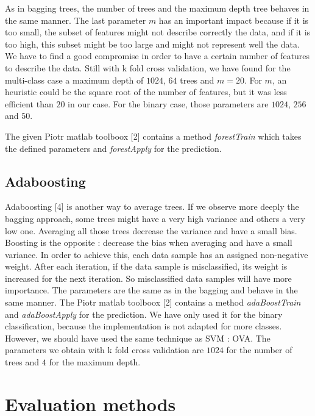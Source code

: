 \documentclass{article} %
\begin{document}
As in bagging trees, the number of trees and the maximum depth tree behaves in the same manner. The last parameter $m$ has an important impact because if it is too small, the subset of features might not describe correctly the data, and if it is too high, this subset might be too large and might not represent well the data. We have to find a good compromise in order to have a certain number of features to describe the data. Still with k fold cross validation, we have found for the multi-class case a maximum depth of $1024$,  $64$ trees and $m = 20$. For $m$, an heuristic could be the square root of the number of features, but it was less efficient than $20$ in our case. For the binary case, those parameters are $1024$, $256$ and $50$.

The given Piotr matlab toolboox [2] contains a method \textit{forestTrain} which takes the defined parameters and \textit{forestApply} for the prediction.

\subsection{Adaboosting}

Adaboosting [4] is another way to average trees. If we observe more deeply the bagging approach, some trees might have a very high variance and others a very low one. Averaging all those trees decrease the variance and have a small bias. Boosting is the opposite : decrease the bias when averaging and have a small variance. In order to achieve this, each data sample has an assigned non-negative weight. After each iteration, if the data sample is misclassified, its weight is increased for the next iteration. So misclassified data samples will have more importance. The parameters are the same as in the bagging and behave in the same manner. The Piotr matlab toolboox [2] contains a method \textit{adaBoostTrain} and \textit{adaBoostApply} for the prediction. We have only used it for the binary classification, because the implementation is not adapted for more classes. However, we should have used the same technique as SVM : OVA. The parameters we obtain with k fold cross validation are $1024$ for the number of trees and $4$ for the maximum depth.

\section{Evaluation methods}
\end{document}
